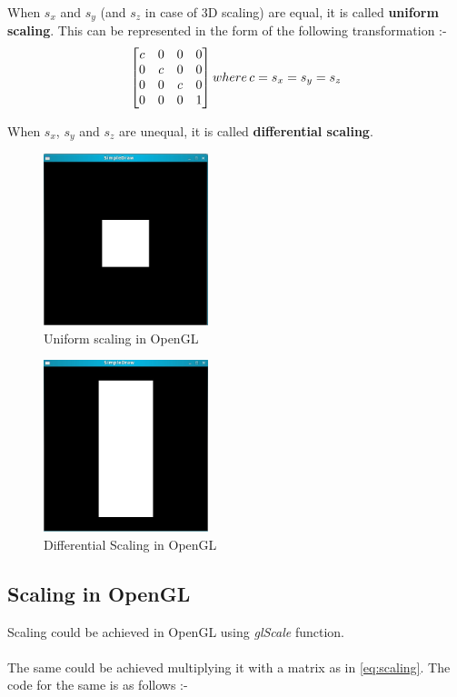 \documentclass[a4paper,12pt,titlepage,twosided]{article}
\begin{document}
	When $s_x$ and $s_y$ (and $s_z$ in case of 3D scaling) are equal, it is called \textbf{uniform scaling}. This can be represented in the form of the following transformation :-
	\begin {equation}
		\begin{bmatrix}
			c & 0 & 0 & 0 \\
			0 & c & 0 & 0 \\
			0 & 0 & c & 0 \\
			0 & 0 & 0 & 1
		\end{bmatrix}
		\\ where\, c = s_x = s_y = s_z
		\label{eq:scaling}
	\end{equation}

	When $s_x$, $s_y$ and $s_z$ are unequal, it is called \textbf{differential scaling}.

	\begin{figure}[h]
		\centering
		\includegraphics[height=50mm]{Images_final/Square_scaled.jpg}
		\caption{Uniform scaling in OpenGL}
		\label{fig:uniform_scaling}
	\end{figure}

	\begin{figure}[h]
		\centering
		\includegraphics[height=50mm]{Images_final/Square_non_uniform_scaling.jpg}
		\caption{Differential Scaling in OpenGL}
		\label{fig:differential_scaling}
	\end{figure}
	\subsection{Scaling in OpenGL}
	Scaling could be achieved in OpenGL using \emph{glScale} function.\\ \\
	The same could be achieved multiplying it with a matrix as in \eqref{eq:scaling}. The code for the same is as follows :-
	
\end{document}
